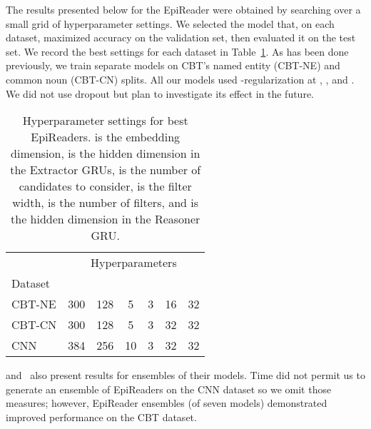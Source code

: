 \documentclass[11pt,letterpaper]{article}
\begin{document}
The results presented below for the EpiReader were obtained by searching over a small grid of hyperparameter settings. We selected the model that, on each dataset, maximized accuracy on the validation set, then evaluated it on the test set. We record the best settings for each dataset in Table~\ref{tab:hyper}. As has been done previously, we train separate models on CBT's named entity (CBT-NE) and common noun (CBT-CN) splits. All our models used -regularization at , , and . We did not use dropout but plan to investigate its effect in the future.
\begin{table}
  \caption{Hyperparameter settings for best EpiReaders.  is the embedding dimension,  is the hidden dimension in the Extractor GRUs,  is the number of candidates to consider,  is the filter width,  is the number of filters, and  is the hidden dimension in the Reasoner GRU.}
  \label{tab:hyper}
  \small
  \centering
  \begin{tabular}{lcccccc}
    \toprule
    {} & \multicolumn{6}{c}{Hyperparameters}          \\
 	\cmidrule{2-7}
    Dataset &  &  &  &  &  &             \\
    \midrule
    CBT-NE & 300 & 128 & 5 & 3 & 16 & 32 \\
    \midrule
    CBT-CN & 300 & 128 & 5 & 3 & 32 & 32 \\
    \midrule
    CNN & 384 & 256 & 10 & 3 & 32 & 32 \\ 
    \bottomrule
  \end{tabular}
\end{table}
 and~ also present results for ensembles of their models. Time did not permit us to generate an ensemble of EpiReaders on the CNN dataset so we omit those measures; however, EpiReader ensembles (of seven models) demonstrated improved performance on the CBT dataset.
\end{document}
